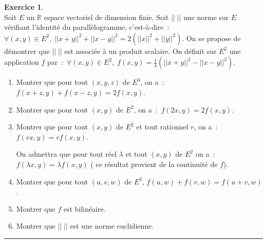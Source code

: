 \documentclass[a4paper,10pt]{article}
\theoremstyle{definition}
\theoremstyle{definition}
\newtheorem{exo}{Exercice}
\newcommand{\R}{\mathbb{R}}
\begin{document}
\begin{exo}\quad\\[0.25cm]
Soit $E$ un $\R$ espace vectoriel de dimension finie. Soit $||\;||$ une norme sur $E$ vérifiant l'identité du parallèlogramme, c'est-à-dire~:~$\forall(x,y)\in E^2,\;||x+y||^2+||x-y||^2=2(||x||^2+||y||^2)$. On se propose de démontrer que $||\;||$ est associée à un produit scalaire.
On définit sur $E^2$ une application $f$ par~:~$\forall(x,y)\in E^2,\;f(x,y)=\frac{1}{4}(||x+y||^2-||x-y||^2)$.
\begin{enumerate}
	\item  Montrer que pour tout $(x,y,z)$ de $E^3$, on a~:~$f(x+z,y)+f(x-z,y)=2f(x,y)$.
	\item  Montrer que pour tout $(x,y)$ de $E^2$, on a~:~$f(2x,y)=2f(x,y)$.
	\item  Montrer que pour tout $(x,y)$ de $E^2$ et tout rationnel $r$, on a~:~$f(rx,y)=rf(x,y)$.
	
	On admettra que pour tout réel $\lambda$ et tout $(x,y)$ de $E^2$ on a~:~$f(\lambda x,y)=\lambda f(x,y)$ ( ce résultat provient de la continuité de $f$).
	\item  Montrer que pour tout $(u,v,w)$ de $E^3$, $f(u,w)+f(v,w)=f(u+v,w)$.
	\item  Montrer que $f$ est bilinéaire.
	\item  Montrer que $||\;||$ est une norme euclidienne.
\end{enumerate}

\centering
\rule{1\linewidth}{0.6pt}
\end{exo}			
\end{document}
